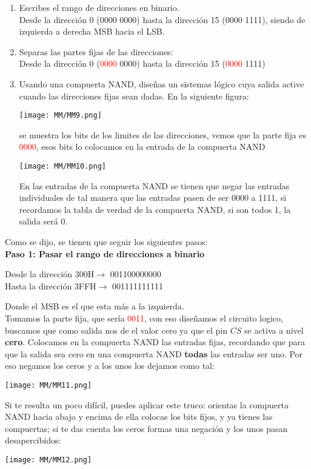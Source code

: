 \documentclass[
	12pt, %
	fleqn, %
	a4paper, %
	oneside, %
]{LegrandOrangeBook}
\begin{document}
\begin{enumerate}
\item Escribes el rango de direcciones en binario.\\
Desde la dirección 0 (0000 0000) hasta la dirección 15 (0000 1111), siendo de izquierda a derecha MSB hacia el LSB.
\item Separas las partes fijas de las direcciones:\\
Desde la dirección 0 (\textcolor{red}{0000} 0000) hasta la dirección 15 (\textcolor{red}{0000} 1111)
\item Usando una compuerta NAND, diseñas un sistemas lógico cuya salida active cuando las direcciones fijas sean dadas.
En la siguiente figura:
\begin{center}
\texttt{[image: MM/MM9.png]}
\end{center}
se muestra los bits de los limites de las direcciones, vemos que la parte fija es \textcolor{red}{0000}, esos bits lo colocamos en la entrada de la compuerta NAND
\begin{center}
\texttt{[image: MM/MM10.png]}
\end{center}
En las entradas de la compuerta NAND se tienen que negar las entradas individuales de tal manera que las entradas pasen de ser 0000 a 1111, si recordamos la tabla de verdad de la compuerta NAND, si son todos 1, la salida será 0.
\end{enumerate}
\begin{example}
Como se dijo, se tienen que seguir los siguientes pasos:\\
\textbf{Paso 1: Pasar el rango de direcciones a binario}\\
\begin{center}
Desde la dirección 300H$\rightarrow$ 001100000000\\
Hasta la dirección 3FFH$\rightarrow$ 001111111111\\
\end{center}
Donde el MSB es el que esta más a la izquierda.\\
Tomamos la parte fija, que sería \textcolor{red}{0011}, con eso diseñamos el circuito logico, buscamos que como salida nos de el valor cero ya que el pin $\overline{CS}$ se activa a nivel \textbf{cero}. Colocamos en la compuerta NAND las entradas fijas, recordando que para que la salida sea cero en una compuerta NAND \textbf{todas} las entradas ser uno. Por eso negamos los ceros y a los unos los dejamos como tal:
\begin{center}
\texttt{[image: MM/MM11.png]}
\end{center}
\begin{remark}
Si te resulta un poco difícil, puedes aplicar este truco: orientas la compuerta NAND hacia abajo y encima de ella colocas los bits fijos, y ya tienes las compuertas; si te das cuenta los ceros formas una negación y los unos pasan desapercibidos:
\begin{center}
\texttt{[image: MM/MM12.png]}
\end{center}
\end{remark}
\end{example}
\end{document}
